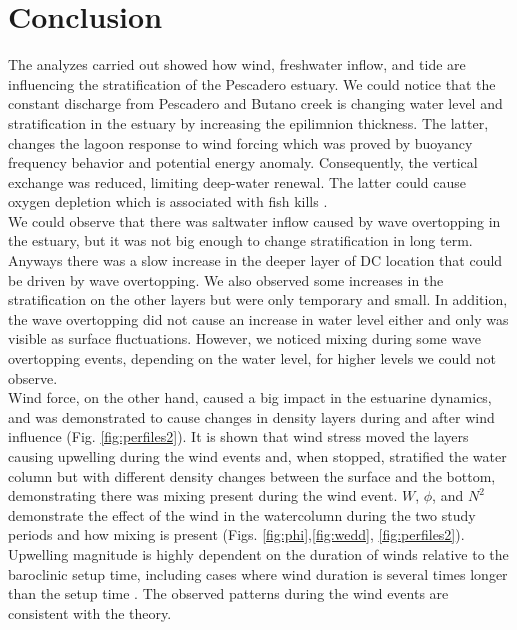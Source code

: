 \documentclass[tesis.tex]{subfiles}
\begin{document}
  
\section{Conclusion}

The analyzes carried out showed how wind, freshwater inflow, and tide are influencing the stratification of the Pescadero estuary. We could notice that the constant discharge from Pescadero and Butano creek is changing water level and stratification in the estuary by increasing the epilimnion thickness. The latter, changes the lagoon response to wind forcing which was proved by buoyancy frequency behavior and potential energy anomaly. Consequently, the vertical exchange was reduced, limiting deep-water renewal. The latter could cause oxygen depletion which is associated with fish kills \citep{Kelly2018}.\\

We could observe that there was saltwater inflow caused by wave overtopping in the estuary, but it was not big enough to change stratification in long term. Anyways there was a slow increase in the deeper layer of DC location that could be driven by wave overtopping. We also observed some increases in the stratification on the other layers but were only temporary and small. In addition, the wave overtopping did not cause an increase in water level either and only was visible as surface fluctuations. However, we noticed mixing during some wave overtopping events, depending on the water level, for higher levels we could not observe.\\

Wind force, on the other hand, caused a big impact in the estuarine dynamics, and was demonstrated to cause changes in density layers during and after wind influence (Fig. \ref{fig:perfiles2}). It is shown that wind stress moved the layers causing upwelling during the wind events and, when stopped, stratified the water column but with different density changes between the surface and the bottom, demonstrating there was mixing present during the wind event. $W$, $\phi$, and $N^2$ demonstrate the effect of the wind in the watercolumn during the two study periods and how mixing is present (Figs. \ref{fig:phi},\ref{fig:wedd}, \ref{fig:perfiles2}). Upwelling magnitude is highly dependent on the duration of winds relative to the baroclinic setup time, including cases where wind duration is several times longer than the setup time \citep{roberts2021setup}. The observed patterns during the wind events are consistent with the theory.\\
\end{document}
